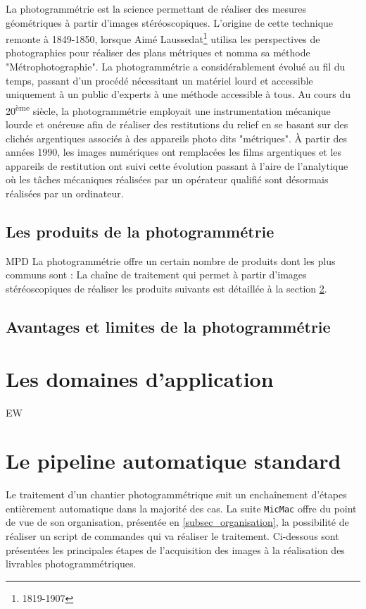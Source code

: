 \documentclass[a4paper,10pt]{article} %
\newcommand{\up}[1]{\textsuperscript{#1}} %
\begin{document}
La photogrammétrie est la science permettant de réaliser des mesures géométriques à partir d'images stéréoscopiques. L'origine de cette technique remonte à 1849-1850, lorsque Aimé Laussedat\footnote{1819-1907} utilisa les perspectives de photographies pour réaliser des plans métriques et nomma sa méthode  "Métrophotographie". La photogrammétrie a considérablement évolué au fil du temps, passant d'un procédé nécessitant un matériel lourd et accessible uniquement à un public d'experts à une méthode accessible à tous. Au cours du 20\up{ème} siècle, la photogrammétrie employait une instrumentation mécanique lourde et onéreuse afin de réaliser des restitutions du relief en se basant sur des clichés argentiques associés à des appareils photo dits "métriques". À partir des années 1990, les images numériques ont remplacées les films argentiques et les appareils de restitution ont suivi cette évolution passant à l'aire de l'analytique où les tâches mécaniques réalisées par un opérateur qualifié sont désormais réalisées par un ordinateur.

\subsection{Les produits de la photogrammétrie}
MPD
La photogrammétrie offre un certain nombre de produits dont les plus communs sont : La chaîne de traitement qui permet à partir d'images stéréoscopiques de réaliser les produits suivants est détaillée à la section \ref{sec_pipeline_auto}.
\subsection{Avantages et limites de la photogrammétrie}

\section{Les domaines d'application}
EW


\section{Le pipeline automatique standard}\label{sec_pipeline_auto}
Le traitement d'un chantier photogrammétrique suit un enchaînement d'étapes entièrement automatique dans la majorité des cas. La suite {\tt MicMac} offre du point de vue de son organisation, présentée en \ref{subsec_organisation}, la possibilité de réaliser un script de commandes qui va réaliser le traitement. Ci-dessous sont présentées les principales étapes de l'acquisition des images à la réalisation des livrables photogrammétriques.
\end{document}
